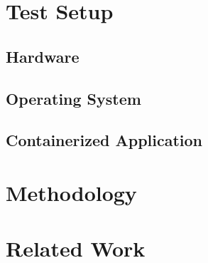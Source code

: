 \section{Test Setup}
\subsection{Hardware}
\subsection{Operating System}
\subsection{Containerized Application}
\section{Methodology}
\section{Related Work}
